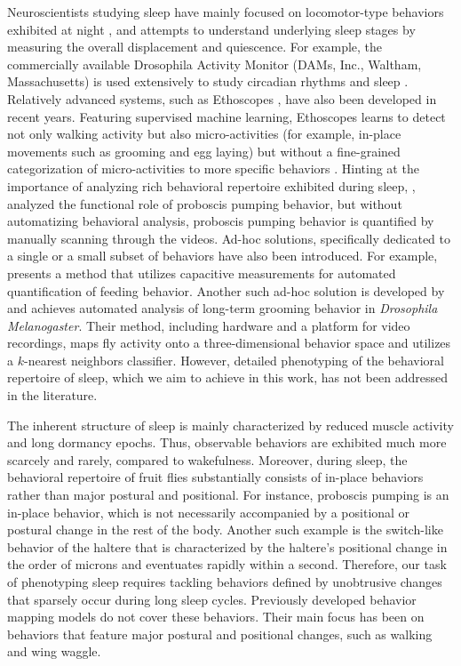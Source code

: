 Neuroscientists studying sleep have mainly focused on locomotor-type behaviors exhibited at night \citep{wiggin_covert_2020, nath_jellyfish_2017}, and attempts to understand underlying sleep stages by measuring the overall displacement and quiescence.
For example, the commercially available Drosophila Activity Monitor (DAMs, Inc., Waltham, Massachusetts) is used extensively to study circadian rhythms and sleep \citep{pfeiffenberger_processing_2010, pfeiffenberger_locomotor_2010}.
Relatively advanced systems, such as Ethoscopes \citep{geissmann_ethoscopes_2017}, have also been developed in recent years.
Featuring supervised machine learning, Ethoscopes learns to detect not only walking activity but also micro-activities (for example, in-place movements such as grooming and egg laying) but without a fine-grained categorization of micro-activities to more specific behaviors \citep{geissmann_most_2019}.
Hinting at the importance of analyzing rich behavioral repertoire exhibited during sleep, \citet{van_alphen_deep_2021}, analyzed the functional role of proboscis pumping behavior, but without automatizing behavioral analysis, proboscis pumping behavior is quantified by manually scanning through the videos.
Ad-hoc solutions, specifically dedicated to a single or a small subset of behaviors have also been introduced.
For example, \citet{itskov_automated_2014} presents a method that utilizes capacitive measurements for automated quantification of feeding behavior.
Another such ad-hoc solution is developed by \citet{qiao_automated_2018} and achieves automated analysis of long-term grooming behavior in \textit{Drosophila Melanogaster}.
Their method, including hardware and a platform for video recordings, maps fly activity onto a three-dimensional behavior space and utilizes a $k$-nearest neighbors classifier.
However, detailed phenotyping of the behavioral repertoire of sleep, which we aim to achieve in this work, has not been addressed in the literature.

The inherent structure of sleep is mainly characterized by reduced muscle activity and long dormancy epochs.
Thus, observable behaviors are exhibited much more scarcely and rarely, compared to wakefulness.
Moreover, during sleep, the behavioral repertoire of fruit flies substantially consists of in-place behaviors rather than major postural and positional.
For instance, proboscis pumping is an in-place behavior, which is not necessarily accompanied by a positional or postural change in the rest of the body.
Another such example is the switch-like behavior of the haltere that is characterized by the haltere's positional change in the order of microns and eventuates rapidly within a second.
Therefore, our task of phenotyping sleep requires tackling behaviors defined by unobtrusive changes that sparsely occur during long sleep cycles.
Previously developed behavior mapping models  do not cover these behaviors.
Their main focus has been on behaviors that feature major postural and positional changes, such as walking and wing waggle.

